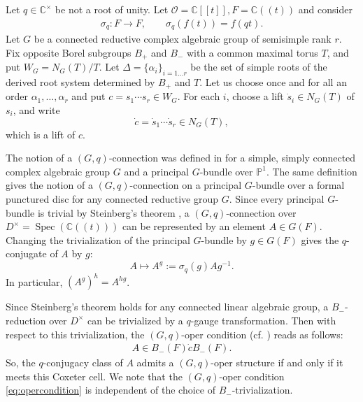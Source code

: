 \documentclass[11pt]{amsart}
\numberwithin{equation}{section}
\theoremstyle{definition}
\theoremstyle{remark}
\DeclareMathOperator{\Spec}{Spec}
\begin{document}
Let $q\in\mathbb{C}^{\times}$ be not a root of unity. Let $\mathcal{O}=\mathbb{C}[[t]],
  F=\mathbb{C}((t))$ and consider
\begin{align}
\sigma_q:F\rightarrow F,\qquad
  \sigma_q(f(t))=f(qt).
\end{align}
Let $G$ be a connected reductive complex algebraic group of semisimple rank $r$.  Fix opposite Borel subgroups
$B_+$ and $B_-$ with a common maximal torus $T$, and put $W_G=N_G(T)/T$.  Let
$\Delta=\{\alpha_i\}_{i=1\ldots r}$ be the set of simple roots of the derived root
system determined by $B_+$ and $T$. Let us choose once and for all an order
$\alpha_{1},\ldots,\alpha_{r}$ and put
$c=s_{1}\cdots s_{r}\in W_G$.
For each $i$, choose a lift $\dot s_i\in N_G(T)$ of $s_i$, and write
\[
  \dot c=\dot s_1\cdots\dot s_r\in N_G(T),
\]
which is a lift of $c$.

The notion of a $(G,q)$-connection was defined in \cite[Section~2]{FKSZ} for a simple, simply connected complex algebraic
group $G$ and a principal $G$-bundle over $\mathbb P^1$. The same
definition gives the notion of a $(G,q)$-connection on a principal
$G$-bundle over a formal punctured disc for any connected reductive group $G$. Since every principal $G$-bundle is trivial by Steinberg's theorem \cite[Chapter III, \S2.3]{Ser}, a $(G,q)$-connection over $D^{\times}=\Spec(\mathbb{C}((t)))$ can be represented by an element $A\in G(F)$. Changing the trivialization of the principal $G$-bundle by $g\in G(F)$ gives the $q$-conjugate of $A$ by $g$:
\begin{equation}\label{eq:gauge-intro}
  A\longmapsto A^g:=\sigma_q(g)Ag^{-1}.
\end{equation}
In particular, $(A^g)^h=A^{hg}$.

Since Steinberg's theorem \cite[Chapter III, \S2.3]{Ser} holds for any connected linear algebraic group, a $B_-$-reduction over
$D^{\times}$ can be trivialized by a $q$-gauge
transformation. Then with respect to this trivialization, the $(G,q)$-oper condition (cf. \cite[Definition~2.1]{FKSZ}) reads as follows:
\begin{align}\label{eq:opercondition}
  A\in B_-(F)\dot cB_-(F).
\end{align}
So, the $q$-conjugacy class of $A$ admits a $(G,q)$-oper structure if
and only if it meets this Coxeter cell.  
We note that the $(G,q)$-oper condition \eqref{eq:opercondition} is independent of the choice of $B_{-}$-trivialization. 
\end{document}
